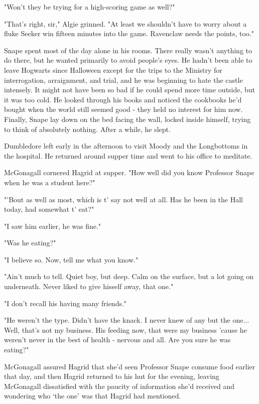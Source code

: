"Won't they be trying for a high-scoring game as well?"

"That's right, sir," Algie grinned. "At least we shouldn't have to worry about a fluke Seeker win fifteen minutes into the game. Ravenclaw needs the points, too."

Snape spent most of the day alone in his rooms. There really wasn't anything to do there, but he wanted primarily to avoid people's eyes. He hadn't been able to leave Hogwarts since Halloween except for the trips to the Ministry for interrogation, arraignment, and trial, and he was beginning to hate the castle intensely. It might not have been so bad if he could spend more time outside, but it was too cold. He looked through his books and noticed the cookbooks he'd bought when the world still seemed good - they held no interest for him now. Finally, Snape lay down on the bed facing the wall, locked inside himself, trying to think of absolutely nothing. After a while, he slept.

Dumbledore left early in the afternoon to visit Moody and the Longbottoms in the hospital. He returned around supper time and went to his office to meditate.

McGonagall cornered Hagrid at supper. "How well did you know Professor Snape when he was a student here?"

"'Bout as well as most, which is t' say not well at all. Has he been in the Hall today, had somewhat t' eat?"

"I saw him earlier, he was fine."

"Was he eating?"

"I believe so. Now, tell me what you know."

"Ain't much to tell. Quiet boy, but deep. Calm on the surface, but a lot going on underneath. Never liked to give hisself away, that one."

"I don't recall his having many friends."

"He weren't the type. Didn't have the knack. I never knew of any but the one... Well, that's not my business. His feeding now, that were my business 'cause he weren't never in the best of health - nervous and all. Are you sure he was eating?"

McGonagall assured Hagrid that she'd seen Professor Snape consume food earlier that day, and then Hagrid returned to his hut for the evening, leaving McGonagall dissatisfied with the paucity of information she'd received and wondering who `the one' was that Hagrid had mentioned.

